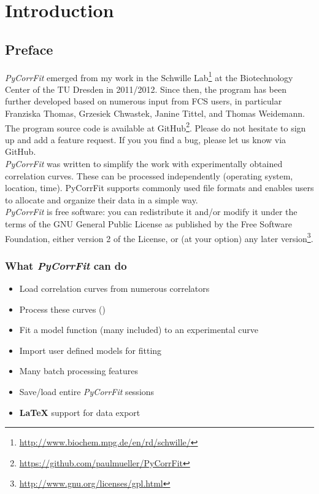 \section{Introduction}
\label{sec:intro}
\subsection{Preface}
\label{sec:intro.prefa}
\textit{PyCorrFit} emerged from my work in the Schwille Lab\footnote{\url{http://www.biochem.mpg.de/en/rd/schwille/}} at the Biotechnology Center of the TU Dresden in 2011/2012. Since then, the program has been further developed based on numerous input from FCS users, in particular Franziska Thomas, Grzesiek Chwastek, Janine Tittel, and Thomas Weidemann. The program source code is available at GitHub\footnote{\url{https://github.com/paulmueller/PyCorrFit}}. Please do not hesitate to sign up and add a feature request. If you you find a bug, please let us know via GitHub.\\

\noindent \textit{PyCorrFit} was written to simplify the work with experimentally obtained correlation curves. These can be processed independently (operating system, location, time). PyCorrFit supports commonly used file formats and enables users to allocate and organize their data in a simple way.\\

\noindent \textit{PyCorrFit} is free software: you can redistribute it and/or modify it
under the terms of the GNU General Public License as published 
by the Free Software Foundation, either version 2 of the License, 
or (at your option) any later version\footnote{\url{http://www.gnu.org/licenses/gpl.html}}.

\subsubsection*{What \textit{PyCorrFit} can do}
\begin{itemize}
\item Load correlation curves from numerous correlators
\item Process these curves ()
\item Fit a model function (many included) to an experimental curve
\item Import user defined models for fitting
\item Many batch processing features
\item Save/load entire \textit{PyCorrFit} sessions
\item \textbf{\LaTeX} support for data export
\end{itemize}

